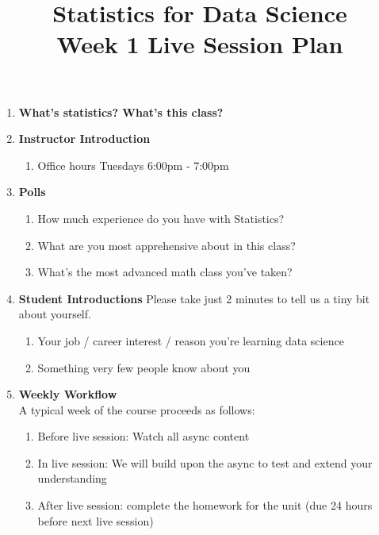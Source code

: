 \documentclass[12pt,a4paper]{article}
\numberwithin{equation}{subsection}
\begin{document}
\title{Statistics for Data Science \\
       Week 1 Live Session Plan}
\maketitle

\begin{enumerate}

\item \textbf{What's statistics? What's this class?}

\item \textbf{Instructor Introduction}

\begin{enumerate}
\item Office hours Tuesdays 6:00pm - 7:00pm
\end{enumerate}

\item \textbf{Polls}

\begin{enumerate}
\item How much experience do you have with Statistics?
\item What are you most apprehensive about in this class?
\item What's the most advanced math class you've taken?
\end{enumerate}


\item \textbf{Student Introductions}
Please take just 2 minutes to tell us a tiny bit about yourself.
\begin{enumerate}
\item Your job / career interest / reason you're learning data science
\item Something very few people know about you
\end{enumerate}

\item \textbf{Weekly Workflow}\\
A typical week of the course proceeds as follows:
\begin{enumerate}
\item Before live session: Watch all async content
\item In live session: We will build upon the async to test and extend your understanding
\item After live session: complete the homework for the unit (due 24 hours before next live session)
\end{enumerate}


\end{enumerate}
\end{document}
